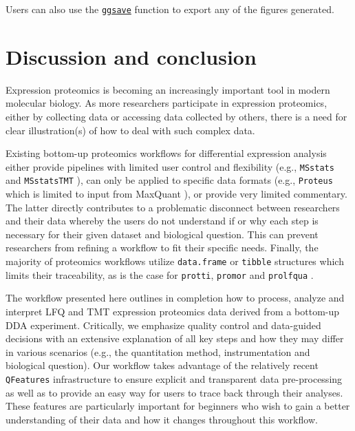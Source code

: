 \documentclass[9pt,a4paper,]{extarticle}
\begin{document}
Users can also use the \href{https://www.rdocumentation.org/packages/ggplot2/versions/0.9.0/topics/ggsave}{\texttt{ggsave}}
function to export any of the figures generated.

\hypertarget{discussion-and-conclusion}{%
\section{Discussion and conclusion}\label{discussion-and-conclusion}}

Expression proteomics is becoming an increasingly important tool in modern
molecular biology. As more researchers participate in expression proteomics,
either by collecting data or accessing data collected by others, there is a need
for clear illustration(s) of how to deal with such complex data.

Existing bottom-up proteomics workflows for differential expression analysis
either provide pipelines with limited user control and flexibility (e.g., \texttt{MSstats}
and \texttt{MSstatsTMT} \citep{Choi2014, Huang2020}), can only be applied to specific data
formats (e.g., \texttt{Proteus} which is limited to input from MaxQuant \citep{Gierlinski2018}),
or provide very limited commentary. The latter directly contributes to a
problematic disconnect between researchers and their data whereby the users do
not understand if or why each step is necessary for their given dataset and
biological question. This can prevent researchers from refining a workflow to fit
their specific needs. Finally, the majority of proteomics workflows utilize
\texttt{data.frame} or \texttt{tibble} structures which limits their traceability, as is the
case for \texttt{protti}, \texttt{promor} and \texttt{prolfqua} \citep{Ranathunge2022, Quast2021, Wolski2022}.

The workflow presented here outlines in completion how to process, analyze and
interpret LFQ and TMT expression proteomics data derived from a bottom-up DDA
experiment. Critically, we emphasize quality control and data-guided decisions
with an extensive explanation of all key steps and how they may differ in
various scenarios (e.g., the quantitation method, instrumentation and biological
question). Our workflow takes advantage of the relatively recent \texttt{QFeatures}
infrastructure to ensure explicit and transparent data pre-processing as well as
to provide an easy way for users to trace back through their analyses. These
features are particularly important for beginners who wish to gain a better
understanding of their data and how it changes throughout this workflow.
\end{document}
